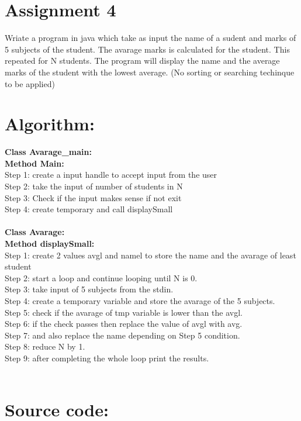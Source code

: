 \section*{\centering Assignment 4}
\vspace{15px}
Wriate a program in java which take as input the name of a sudent 
and marks of 5 subjects of the student. The avarage marks is calculated 
for the student. This repeated for N students. The program will 
display the name and the average marks of the student with the lowest average.
(No sorting or searching techinque to be applied)

\section*{Algorithm:}
\textbf{\color{javapurple}Class Avarage\_main:}\\
\textbf{Method Main:}\\
Step 1: create a input handle to accept input from the user\\
Step 2: take the input of number of students in N \\
Step 3: Check if the input makes sense if not exit \\
Step 4: create temporary and call displaySmall\\\\
\textbf{\color{javapurple}Class Avarage:}\\
\textbf{Method displaySmall:}\\
Step 1: create 2 values avgl and namel to store the name and the avarage of least student\\
Step 2: start a loop and continue looping until N is 0.\\
Step 3: take input of 5 subjects from the stdin.\\
Step 4: create a temporary variable and store the avarage of the 5 subjects.\\
Step 5: check if the avarage of tmp variable is lower than the avgl.\\
Step 6: if the check passes then replace the value of avgl with avg. \\
Step 7: and also replace the name depending on Step 5 condition. \\
Step 8: reduce N by 1.\\
Step 9: after completing the whole loop print the results.\\\\

\section*{Source code:}



